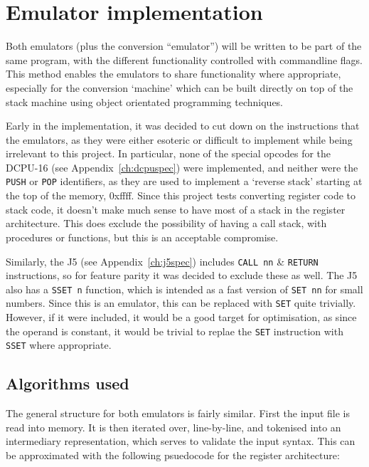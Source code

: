 \section{Emulator implementation}
Both emulators (plus the conversion ``emulator'') will be written to be part of
the same program, with the different functionality controlled with commandline
flags. This method enables the emulators to share functionality where
appropriate, especially for the conversion `machine' which can be built directly
on top of the stack machine using object orientated programming techniques.

Early in the implementation, it was decided to cut down on the instructions that
the emulators, as they were either esoteric or difficult to implement while
being irrelevant to this project. In particular, none of the special opcodes for
the DCPU-16 (see Appendix~\ref{ch:dcpuspec}) were implemented, and neither were
the \lstinline{PUSH} or \lstinline{POP} identifiers, as they are used to
implement a `reverse stack' starting at the top of the memory, 0xffff. Since
this project tests converting register code to stack code, it doesn't make much
sense to have most of a stack in the register architecture. This does exclude
the possibility of having a call stack, with procedures or functions, but this
is an acceptable compromise.

Similarly, the J5 (see Appendix~\ref{ch:j5spec}) includes \lstinline{CALL nn} \&
\lstinline{RETURN} instructions, so for feature parity it was decided to exclude
these as well. The J5 also has a \lstinline{SSET n} function, which is intended
as a fast version of \lstinline{SET nn} for small numbers. Since this is an
emulator, this can be replaced with \lstinline{SET} quite trivially. However, if
it were included, it would be a good target for optimisation, as since the
operand is constant, it would be trivial to replae the \lstinline{SET}
instruction with \lstinline{SSET} where appropriate.

\subsection{Algorithms used}
The general structure for both emulators is fairly similar. First the input
file is read into memory. It is then iterated over, line-by-line, and tokenised
into an intermediary representation, which serves to validate the input syntax.
This can be approximated with the following psuedocode for the register
architecture:

